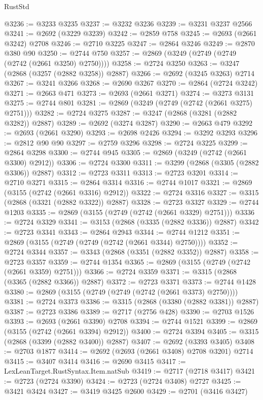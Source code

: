 \begin{lexlean}{RustStd}
\begin{coremodule}
@3236 := @3233 @3235
@3237 := @3232 @3236
@3239 := @3231 @3237 @2566
@3241 := @2692 (@3229 @3239)
@3242 := @2859 @758
@3245 := @2693 (@2661 @3242) @2708
@3246 := @2710 @3225
@3247 := @2864 @3246
@3249 := @2870 @380 @90
@3250 := @2744 @750
@3257 := @2869 (@3249 (@2749 (@2749 (@2742 (@2661 @3250) @2750))))
@3258 := @2724 @3250
@3263 := @3247 (@2868 (@3257 (@2882 @3258)) @2887)
@3266 := @2692 (@3245 @3263) @2714
@3267 := @3241 @3266
@3268 := @2690 @3267
@3270 := @2864 (@2724 @3242)
@3271 := @2663 @471
@3273 := @2693 (@2661 @3271)
@3274 := @3273 @3131
@3275 := @2744 @801
@3281 := @2869 (@3249 (@2749 (@2742 (@2661 @3275) @2751)))
@3282 := @2724 @3275
@3287 := @3247 (@2868 (@3281 (@2882 @3282)) @2887)
@3289 := @2692 (@3274 @3287)
@3290 := @2663 @479
@3292 := @2693 (@2661 @3290)
@3293 := @2698 @2426
@3294 := @3292 @3293
@3296 := @2812 @90 @90
@3297 := @2759 @3296
@3298 := @2724 @3225
@3299 := @2864 @3298
@3300 := @2744 @945
@3305 := @2869 (@3249 (@2742 (@2661 @3300) @2912))
@3306 := @2724 @3300
@3311 := @3299 (@2868 (@3305 (@2882 @3306)) @2887)
@3312 := @2723 @3311
@3313 := @2723 @3201
@3314 := @2710 @3271
@3315 := @2864 @3314
@3316 := @2744 @1017
@3321 := @2869 (@3155 (@2742 (@2661 @3316) @2912))
@3322 := @2724 @3316
@3327 := @3315 (@2868 (@3321 (@2882 @3322)) @2887)
@3328 := @2723 @3327
@3329 := @2744 @1203
@3335 := @2869 (@3155 (@2749 (@2742 (@2661 @3329) @2751)))
@3336 := @2724 @3329
@3341 := @3153 (@2868 (@3335 (@2882 @3336)) @2887)
@3342 := @2723 @3341
@3343 := @2864 @2943
@3344 := @2744 @1212
@3351 := @2869 (@3155 (@2749 (@2749 (@2742 (@2661 @3344) @2750))))
@3352 := @2724 @3344
@3357 := @3343 (@2868 (@3351 (@2882 @3352)) @2887)
@3358 := @2723 @3357
@3359 := @2744 @1354
@3365 := @2869 (@3155 (@2749 (@2742 (@2661 @3359) @2751)))
@3366 := @2724 @3359
@3371 := @3315 (@2868 (@3365 (@2882 @3366)) @2887)
@3372 := @2723 @3371
@3373 := @2744 @1428
@3380 := @2869 (@3155 (@2749 (@2749 (@2742 (@2661 @3373) @2750))))
@3381 := @2724 @3373
@3386 := @3315 (@2868 (@3380 (@2882 @3381)) @2887)
@3387 := @2723 @3386
@3389 := @2717 (@2756 @428)
@3390 := @2703 @1526
@3393 := @2693 (@2661 @3390) @2708
@3394 := @2744 @1521
@3399 := @2869 (@3155 (@2742 (@2661 @3394) @2912))
@3400 := @2724 @3394
@3405 := @3315 (@2868 (@3399 (@2882 @3400)) @2887)
@3407 := @2692 (@3393 @3405)
@3408 := @2703 @1877
@3414 := @2692 (@2693 (@2661 @3408) @2708 @3201) @2714
@3415 := @3407 @3414
@3416 := @2690 @3415
@3417 := LexLeanTarget.RustSyntax.Item.natSub
@3419 := @2717 (@2718 @3417)
@3421 := @2723 (@2724 @3390)
@3424 := @2723 (@2724 @3408) @2727
@3425 := @3421 @3424
@3427 := @3419 @3425 @2600
@3429 := @2701 (@3416 @3427)

\end{coremodule}
\end{lexlean}
